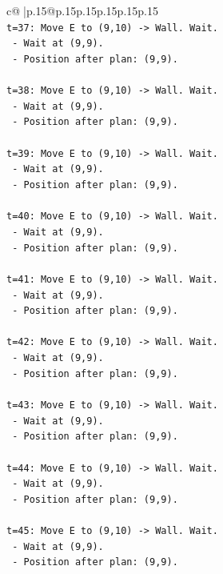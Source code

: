 \documentclass{article}
\begin{document}
{\begin{supertabular}{c@{$\;$}|p{.15\linewidth}@{}p{.15\linewidth}p{.15\linewidth}p{.15\linewidth}p{.15\linewidth}p{.15\linewidth}}
{{{\\ 
\texttt{t=37: Move E to (9,10) {-}> Wall. Wait.} \\
\texttt{   {-} Wait at (9,9).} \\
\texttt{   {-} Position after plan: (9,9).} \\
\\ 
\texttt{t=38: Move E to (9,10) {-}> Wall. Wait.} \\
\texttt{   {-} Wait at (9,9).} \\
\texttt{   {-} Position after plan: (9,9).} \\
\\ 
\texttt{t=39: Move E to (9,10) {-}> Wall. Wait.} \\
\texttt{   {-} Wait at (9,9).} \\
\texttt{   {-} Position after plan: (9,9).} \\
\\ 
\texttt{t=40: Move E to (9,10) {-}> Wall. Wait.} \\
\texttt{   {-} Wait at (9,9).} \\
\texttt{   {-} Position after plan: (9,9).} \\
\\ 
\texttt{t=41: Move E to (9,10) {-}> Wall. Wait.} \\
\texttt{   {-} Wait at (9,9).} \\
\texttt{   {-} Position after plan: (9,9).} \\
\\ 
\texttt{t=42: Move E to (9,10) {-}> Wall. Wait.} \\
\texttt{   {-} Wait at (9,9).} \\
\texttt{   {-} Position after plan: (9,9).} \\
\\ 
\texttt{t=43: Move E to (9,10) {-}> Wall. Wait.} \\
\texttt{   {-} Wait at (9,9).} \\
\texttt{   {-} Position after plan: (9,9).} \\
\\ 
\texttt{t=44: Move E to (9,10) {-}> Wall. Wait.} \\
\texttt{   {-} Wait at (9,9).} \\
\texttt{   {-} Position after plan: (9,9).} \\
\\ 
\texttt{t=45: Move E to (9,10) {-}> Wall. Wait.} \\
\texttt{   {-} Wait at (9,9).} \\
\texttt{   {-} Position after plan: (9,9).} \\
}}}
\end{supertabular}}
\end{document}
